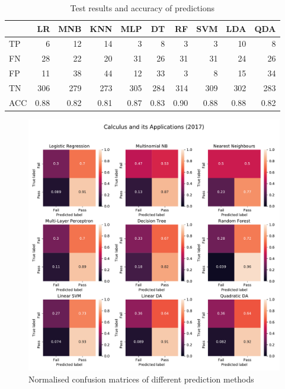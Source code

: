 \documentclass[a4paper]{report}
\begin{document}
\begin{table}[H]
  \centering
  \begin{tabular}{lrrrrrrrrr}
    \toprule
    {} &   LR &  MNB &  KNN &  MLP &   DT &   RF &  SVM &  LDA &  QDA \\
    \midrule
    TP  &    6 &   12 &   14 &    3 &    8 &    3 &    3 &   10 &    8 \\
    FN  &   28 &   22 &   20 &   31 &   26 &   31 &   31 &   24 &   26 \\
    FP  &   11 &   38 &   44 &   12 &   33 &    3 &    8 &   15 &   34 \\
    TN  &  306 &  279 &  273 &  305 &  284 &  314 &  309 &  302 &  283 \\
    ACC & 0.88 & 0.82 & 0.81 & 0.87 & 0.83 & 0.90 & 0.88 & 0.88 & 0.82 \\
    \bottomrule
  \end{tabular}
  \caption{\label{tab:ML_ILA_bin_Qual_17}Test results and accuracy of predictions}
\end{table}

\begin{figure}[H]
  \centering
  \includegraphics[width=\linewidth]{fig/ML_CAP_bin_Qual_17.pdf}
  \caption{\label{fig:ML_CAP_bin_Qual_17}Normalised confusion matrices of different prediction methods}
\end{figure}
\end{document}

